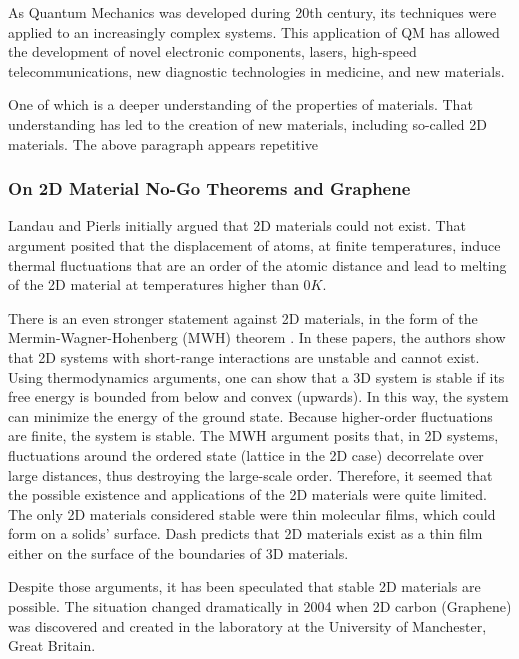 As Quantum Mechanics was developed during 20th century, its techniques were applied to an increasingly complex systems. This application of QM has allowed the development of novel electronic components, lasers, high-speed telecommunications, new diagnostic technologies in medicine, and new materials.

  One of which is a deeper understanding of the properties of materials. That understanding has led to the creation of new materials, including so-called 2D materials.
\textcolor{}{ The above paragraph appears repetitive}

\subsubsection{On 2D Material No-Go Theorems and
Graphene}
Landau and Pierls\cite{LandauG}\cite{Pierls} initially argued that 2D materials could not exist. That argument posited that the displacement of atoms, at finite temperatures, induce thermal fluctuations that are an order of the atomic distance\cite{LandauG, Pierls} and lead to melting of the 2D material at temperatures higher than $ 0 K $. 

There is an even stronger statement against 2D materials, in the form of the Mermin-Wagner-Hohenberg (MWH) theorem \cite{Hohenberg}\cite{Mermin2}. In these papers, the authors show that 2D systems with short-range interactions are unstable and cannot exist.  Using thermodynamics arguments, one can show that a 3D system is stable if its free energy is bounded from below and convex (upwards). In this way, the system can minimize the energy of the ground state. Because higher-order fluctuations are finite, the system is stable.
The MWH argument posits that, in 2D systems, fluctuations around the ordered state (lattice in the 2D case) decorrelate over large distances, thus destroying the large-scale order. 
Therefore, it seemed that the possible existence and applications of the 2D materials were quite limited. The only 2D materials considered stable were thin molecular films, which could form on a solids' surface. Dash\cite{2DMatter1} predicts that 2D materials exist as a thin film either on the surface of the boundaries of 3D materials.

Despite those arguments, it has been speculated that stable 2D materials are possible\cite{2DMatter1}. The situation changed dramatically in 2004 when 2D carbon (Graphene) was discovered and created in the laboratory\cite{Graphene0, GrapheneN} at the University of Manchester, Great Britain. 

